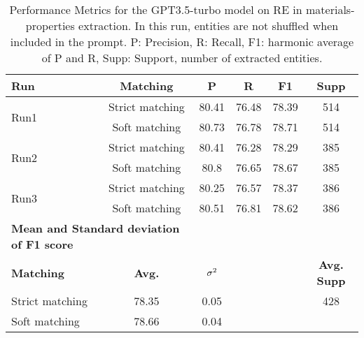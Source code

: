 \begin{table}[htbp]
  \small
  \centering
  \caption{Performance Metrics for the GPT3.5-turbo model on RE in materials-properties extraction. In this run, entities are not shuffled when included in the prompt. P: Precision, R: Recall, F1: harmonic average of P and R, Supp: Support, number of extracted entities.}
  \begin{tabular}{lccccc}
    \toprule
    \textbf{Run} & \textbf{Matching} & \textbf{P} & \textbf{R} & \textbf{F1} & \textbf{Supp} \\
    \midrule
    \multirow{2}{*}{Run1} & Strict matching & 80.41 & 76.48 & 78.39 & 514 \\
    & Soft matching & 80.73 & 76.78 & 78.71 & 514 \\
    \midrule
    \multirow{2}{*}{Run2} & Strict matching & 80.41 & 76.28 & 78.29 & 385 \\
    & Soft matching & 80.8 & 76.65 & 78.67 & 385 \\
    \midrule
    \multirow{2}{*}{Run3} & Strict matching & 80.25 & 76.57 & 78.37 & 386 \\
    & Soft matching & 80.51 & 76.81 & 78.62 & 386 \\
    \midrule
    \multicolumn{2}{l}{\textbf{Mean and Standard deviation of F1 score}} & & & & \\
    \midrule
    \textbf{Matching} & \textbf{Avg.} & $\sigma\textsuperscript{2}$ & & & \textbf{Avg. Supp}\\
    Strict matching & 78.35 & 0.05 & & & 428 \\
    Soft matching & 78.66 & 0.04 & & & \\
    \bottomrule
  \end{tabular}
\end{table}


